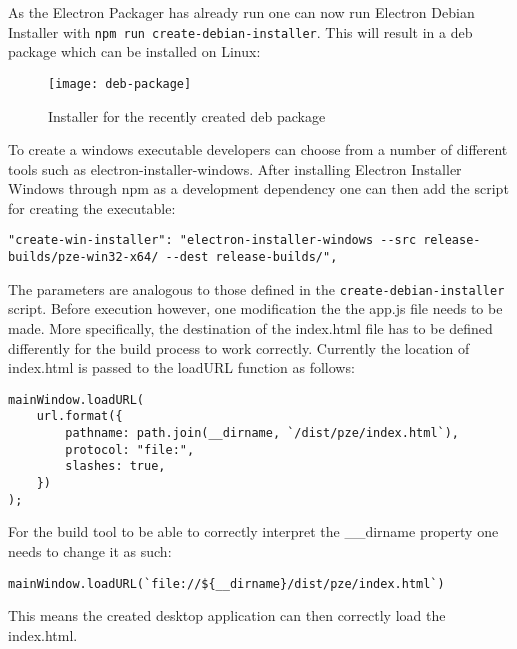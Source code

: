 As the Electron Packager has already run one can now run Electron Debian Installer with 
\lstinline[columns=fixed]{npm run create-debian-installer}.
This will result in a \acrshort{deb} package which can be installed on Linux:
\begin{figure}[H]
    \centering
    \label{fig:pze-deb-package}
    \texttt{[image: deb-package]}
    \caption{Installer for the recently created \acrshort{deb} package}
\end{figure}
To create a windows executable developers can choose from a number of different tools such as 
electron-installer-windows.
After installing Electron Installer Windows through \acrshort{npm} as a development dependency one 
can then add the script for creating the executable:
\begin{lstlisting}[caption=Script for creating a windows executable.]
"create-win-installer": "electron-installer-windows --src release-builds/pze-win32-x64/ --dest release-builds/",
\end{lstlisting}
The parameters are analogous to those defined in the \lstinline[columns=fixed]{create-debian-installer} script.
Before execution however, one modification the the app.js file needs to be made.
More specifically, the destination of the index.html file has to be defined differently for the build process to 
work correctly. 
Currently the location of index.html is passed to the loadURL function as follows:
\begin{lstlisting}[caption=Passing index.html location to loadURL().]
mainWindow.loadURL(
    url.format({
        pathname: path.join(__dirname, `/dist/pze/index.html`),
        protocol: "file:",
        slashes: true,
    })
);
\end{lstlisting}
For the build tool to be able to correctly interpret the \_\_dirname property one needs 
to change it as such:
\begin{lstlisting}[caption=Passing index.html location to loadURL().]
mainWindow.loadURL(`file://${__dirname}/dist/pze/index.html`)
\end{lstlisting}
This means the created desktop application can then correctly load the index.html.
